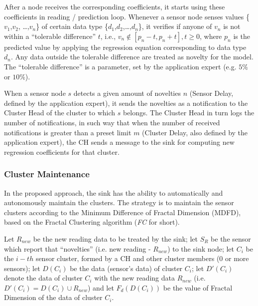 \documentclass{acm_proc_article-sp}
\begin{document}
After a node receives the corresponding coefficients, it starts using these
coefficients in reading / prediction loop.
Whenever a sensor node senses values \{$v_{1}$,$v_{2}$, \ldots,$v_{n}$\} of
certain data type \{$d_{1}$,$d_{2}$,\ldots,$d_{n}$\}, it verifies if anyone of
$v_{n}$ is not within a ``tolerable difference'' $t$, i.e., $v_{n} \not \in
[p_{n}-t,p_{n}+t], t \geq 0$, where $p_{n}$ is the predicted value by applying
the regression equation corresponding to data type $d_{n}$. Any data outside the
tolerable difference are treated as novelty for the model.
The ``tolerable difference'' is a parameter, set by the application expert (e.g.
$5\%$ or $10\%$).



When a sensor node $s$ detects a given amount of novelties $n$ (Sensor Delay,
defined by the application expert), it sends the novelties as a notification to
the Cluster Head of the cluster to which $s$ belongs. The Cluster Head in turn
logs the number of notifications, in such way that when the number of received
notifications is greater than a preset limit $m$ (Cluster Delay, also
defined by the application expert), the CH sends a message to the sink for
computing new regression coefficients for that cluster.


\subsubsection{Cluster Maintenance}
\label{cluster-maintenance}

In the proposed approach, the sink has the ability to automatically and
autonomously maintain the clusters. The strategy is to maintain the sensor
clusters according to the Minimum Difference of Fractal Dimension (MDFD), based
on the Fractal Clustering algorithm (\textit{FC} for short).

Let $R_{new}$ be the new reading data to be treated by the sink; let $S_{R}$ be
the sensor which report that ``novelties'' (i.e. new reading - $R_{new}$) to the
sink node; let $C_i$ be the $i-th$ sensor cluster, formed by a 
CH and other cluster members (0 or more sensors); let $D(C_i)$
be the data (sensor's data) of cluster $C_i$; let $D'(C_i)$ denote the data of
cluster $C_i$ with the new reading data $R_{new}$ (i.e. $D'(C_i) = D(C_i) \cup
R_{new}$) and let $F_{d}(D(C_i))$ be the value of Fractal Dimension of the data
of cluster $C_i$.
\end{document}
